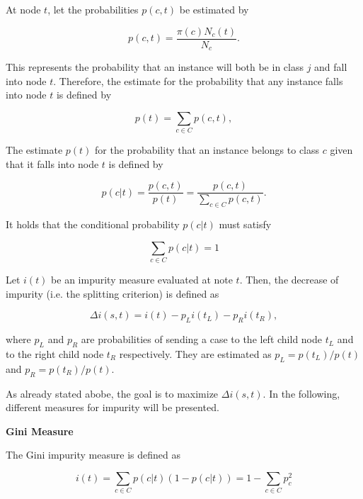 At node \(t\), let the probabilities \(p(c,t)\) be estimated by 

\begin{equation}
    p(c,t) = \frac{ \pi(c)N_{c}(t) }{ N_{c} }.
\end{equation}

This represents the probability that an instance will both be  in class \(j\) and fall into node \(t\).
Therefore, the estimate for the probability that any instance falls into node \(t\) is defined by

\begin{equation}
    p(t) = \sum_{c \in C} p(c,t),
\end{equation}

The estimate \( p(t) \) for the probability that an instance belongs to class \(c\) given that it falls into node \(t\) is defined by

\begin{equation}
    p(c|t) = \frac{ p(c,t)}{ p(t) } = \frac{ p(c,t) }{ \sum_{c \in C} p(c,t) }.
\end{equation}

It holds that the conditional probability \(p(c|t)\) must satisfy

\begin{equation}
    \sum_{c \in C} p(c|t)  = 1
\end{equation}

Let \(i(t)\) be an impurity measure evaluated at note \(t\). Then, the decrease of impurity (i.e. the splitting criterion) is defined as

\begin{equation}
    \Delta i(s,t) = i(t) - p_{L} i(t_{L}) - p_{R} i(t_{R}),
\end{equation}

where \(p_{L}\) and \(p_{R}\) are probabilities of sending a case to the left child node \(t_{L}\) and to the
right child node \(t_{R}\) respectively. 
They are estimated as \( p_{L} = p(t_{L}) / p(t) \) and \( p_{R} = p(t_{R}) / p(t) \).

As already stated abobe, the goal is to maximize \(\Delta i(s,t)\).
In the following, different measures for impurity will be presented.

\textbf{Gini Measure}

The Gini impurity measure is defined as 


\begin{equation}
    i(t) = \sum_{c \in C} p(c|t) (1 - p(c|t)) = 1 - \sum_{c \in C} p_{c}^{2}
\end{equation}

